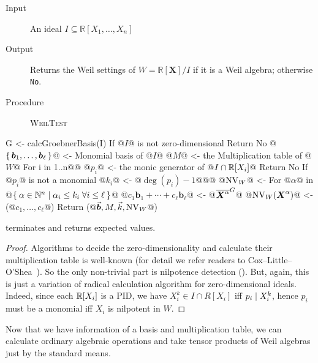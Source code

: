 \documentclass[%
  sigconf,authorversion,screen]{acmart}
\begin{document}
\begin{algorithm}\label{alg:weil-test}
  \hspace{1em}\vspace{-.25em}
  \begin{description}
    \item[Input] An ideal $I \subseteq \mathbb{R}[X_1, \dots, X_n]$
    \item[Output] Returns the Weil settings of $W = \mathbb{R}[\boldsymbol{X}]/I$ if it is a Weil algebra; otherwise \verb|No|.
    \item[Procedure] \textup{\textsc{WeilTest}}
  \end{description}

  \begin{alg}
G <- calcGroebnerBasis(I)
If @$I$@ is not zero-dimensional
  Return No
@$\set{\boldsymbol{b}_1, \dots, \boldsymbol{b}_\ell}$@ <- Monomial basis of @$I$@
@$M$@ <- the Multiplication table of @$W$@
For i in 1..n@\label{line:weil-test:radical-start}@
  @$p_i$@ <- the monic generator of @$I \cap \mathbb{R}[X_i]$@
  Return No If @$p_i$@ is not a monomial
  @$k_i$@ <- @$\deg(p_i) - 1$@@\label{line:weil-test:radical-end}@
@$\operatorname{NV}_W$@ <- {}
For @$\alpha$@ in @$\Set{\alpha \in \mathbb{N}^n | \alpha_i \leq k_i \; \forall i \leq \ell}$@
  @$c_1 \boldsymbol{b}_1 + \cdots + c_\ell \boldsymbol{b}_\ell$@ <- @${\overline{\boldsymbol{X}^\alpha}}^{G}$@
  @$\operatorname{NV}_W(\boldsymbol{X}^\alpha)$@ <- (@$c_1, \dots, c_\ell$@)
Return (@$\vec{\boldsymbol{b}}, M, \vec{k}, \operatorname{NV}_W$@)
\end{alg}
\end{algorithm}

\begin{theorem}
   terminates and returns expected values.
\end{theorem}
\begin{proof}
  Algorithms to decide the zero-dimensionality and calculate their multiplication table is well-known (for detail we refer readers to Cox--Little--O'Shea~\cite[Chapter 2]{CLO:2005}).
  So the only non-trivial part is nilpotence detection ().
  But, again, this is just a variation of radical calculation algorithm for zero-dimensional ideals.
  Indeed, since each $\mathbb{R}[X_i]$ is a PID, we have $X_i^k \in I \cap R[X_i]$ iff $p_i \mathrel{\mid} X_i^k$, hence $p_i$ must be a monomial iff $X_i$ is nilpotent in $W$.
\end{proof}
Now that we have information of a basis and multiplication table, we can calculate ordinary algebraic operations and take tensor products of Weil algebras just by the standard means.
\end{document}
